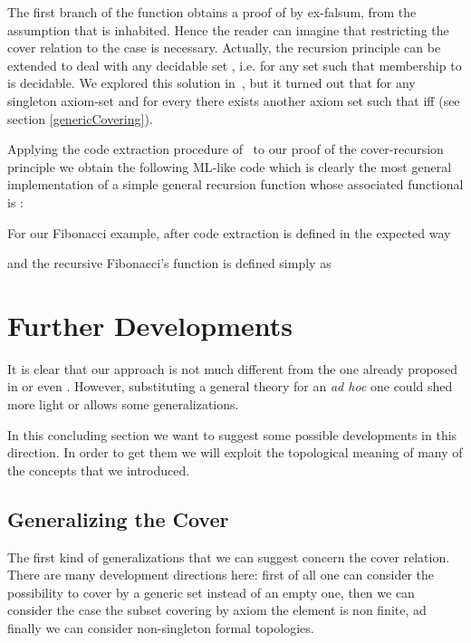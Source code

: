 \documentclass[copyright,creativecommons]{eptcs}
\begin{document}
The first branch of the  function obtains a proof of 
by ex-falsum, from the assumption that  is inhabited. Hence the
reader can imagine that restricting the cover relation to the case
 is necessary. Actually, the recursion principle can be extended
to deal with any decidable set , i.e. for any set  such that membership
to  is decidable. We explored this solution in~\cite{Sac10}, but it turned
out that for any singleton axiom-set  and for every 
there exists another axiom set  such that  iff
 (see section \ref{genericCovering}). 


Applying the code extraction procedure of~\cite{Let08} to our proof of the
cover-recursion principle we obtain the following ML-like code which is
clearly the most general implementation of a simple general recursion function
whose associated functional is :



For our Fibonacci example, after code extraction  is defined in the
expected way



\noindent
and the recursive Fibonacci's function is defined simply as




\section{Further Developments}
\label{developments}
It is clear that our approach is not much different from the one already proposed in \cite{BC05}
or even \cite{Nor88}.
However, substituting a general theory for an {\em ad hoc} one could shed more light or allows 
some generalizations.


In this concluding section we want to suggest some possible developments in this direction.
In order to get them we will exploit the topological meaning of many of the concepts that
we introduced.

\subsection{Generalizing the Cover}

The first kind of generalizations that we can suggest concern the cover relation.
There are many development directions here: first of all one can consider the possibility to cover by a 
generic set instead of an empty one, then we can consider the case the subset  covering by
axiom the element  is non finite, ad finally we can consider non-singleton formal topologies.
\end{document}
